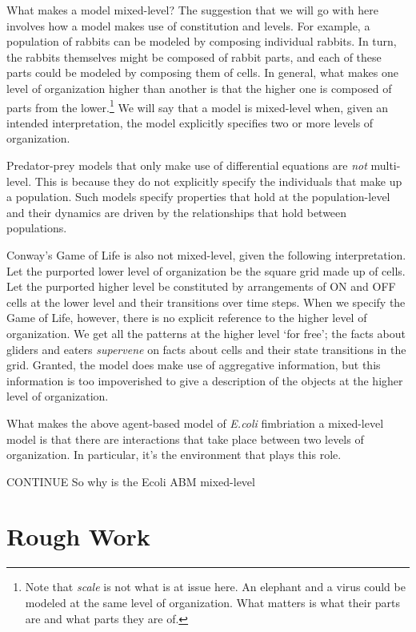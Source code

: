 \documentclass[11pt]{article}
\begin{document}
What makes a model mixed-level? The suggestion that we will go with here involves how a model makes use of constitution and levels. For example, a population of rabbits can be modeled by composing individual rabbits. In turn, the rabbits themselves might be composed of rabbit parts, and each of these parts could be modeled by  composing them of cells.  In general, what makes one level of organization higher than another is that the higher one is composed of parts from the lower.\footnote{Note that \emph{scale} is not what is at issue here. An elephant and a virus could be modeled at the same level of organization. What matters is what their parts are and what parts they are of.} We will say that a model is mixed-level when, given an intended interpretation, the model explicitly specifies two or more levels of organization. 

Predator-prey models that only make use of differential equations are \emph{not} multi-level. This is because they do not explicitly specify the individuals that make up a population. Such models specify properties that hold at the population-level and their dynamics are driven by the relationships that hold between populations.

Conway's Game of Life is also not mixed-level, given the following interpretation. Let the purported lower level of organization be the square grid made up of cells. Let the purported higher level be constituted by arrangements of ON and OFF cells at the lower level and their transitions over time steps. When we specify the Game of Life, however, there is no explicit reference to the higher level of organization. We get all the patterns at the higher level `for free'; the facts about gliders and eaters \emph{supervene} on facts about cells and their state transitions in the grid. Granted, the model does make use of aggregative information, but this information is too impoverished to give a description of the objects at the higher level of organization.


What makes the above agent-based model of \emph{E.coli} fimbriation a mixed-level model is that there are interactions that take place between two levels of organization. In particular, it's the environment that plays this role. 


CONTINUE So why is the Ecoli ABM mixed-level








\section{Rough Work}
\end{document}
